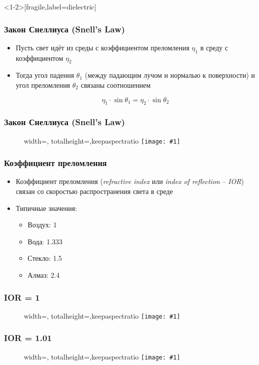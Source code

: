 \documentclass[10pt,handout]{beamer}
\newcommand{\slideimage}[1]{
  \begin{figure}
    \begin{adjustbox}{width=\textwidth, totalheight=\textheight-2\baselineskip-2\baselineskip,keepaspectratio}
      \texttt{[image: \#1]}
    \end{adjustbox}
  \end{figure}
}
\begin{document}
\begin{frame}<1-2>[fragile,label=dielectric]
\frametitle{Закон Снеллиуса (Snell's Law)}
\begin{itemize}
\item Пусть свет идёт из среды с коэффициентом преломления \begin{math}\eta_1\end{math} в среду с коэффициентом \begin{math}\eta_2\end{math}
\pause
\item Тогда угол падения \begin{math}\theta_1\end{math} (между падающим лучом и нормалью к поверхности) и угол преломления \begin{math}\theta_2\end{math} связаны соотношением

\begin{equation*}
\eta_1 \cdot \sin \theta_1 = \eta_2 \cdot \sin \theta_2
\end{equation*}
\end{itemize}
\end{frame}

\begin{frame}[fragile]
\frametitle{Закон Снеллиуса (Snell's Law)}
\slideimage{snells_law.png}
\end{frame}

\begin{frame}
\frametitle{Коэффициент преломления}
\begin{itemize}
\item Коэффициент преломления (\textit{refractive index} или \textit{index of reflection} -- \textit{IOR}) связан со скоростью распространения света в среде
\pause
\item Типичные значения:
\begin{itemize}
\item Воздух: 1
\item Вода: 1.333
\item Стекло: 1.5
\item Алмаз: 2.4
\end{itemize}
\end{itemize}
\end{frame}

\begin{frame}[fragile]
\frametitle{IOR = 1}
\slideimage{ior_100.png}
\end{frame}

\begin{frame}[fragile]
\frametitle{IOR = 1.01}
\slideimage{ior_101.png}
\end{frame}
\end{document}
